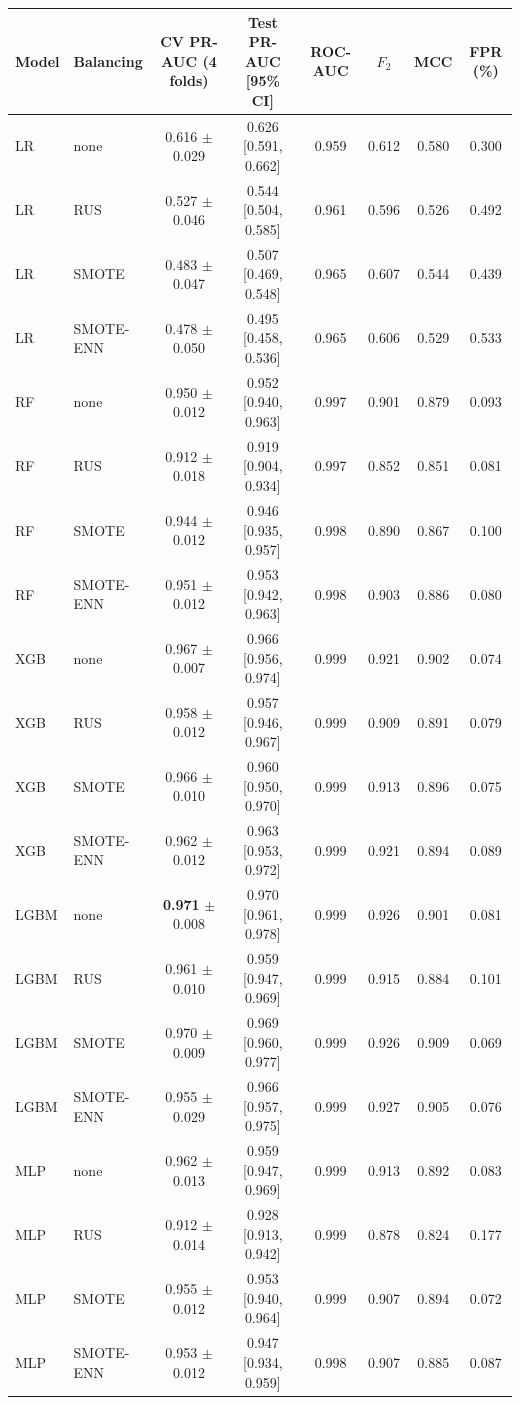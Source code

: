 \begin{tabular}{llcccccc}
\hline
Model & Balancing & CV PR-AUC (4 folds) & Test PR-AUC [95\% CI] & ROC-AUC & $F_2$ & MCC & FPR (\%) \\
\hline
LR & none & {0.616} $\pm$ 0.029 & 0.626 [0.591, 0.662] & 0.959 & 0.612 & 0.580 & 0.300 \\
LR & RUS & {0.527} $\pm$ 0.046 & 0.544 [0.504, 0.585] & 0.961 & 0.596 & 0.526 & 0.492 \\
LR & SMOTE & {0.483} $\pm$ 0.047 & 0.507 [0.469, 0.548] & 0.965 & 0.607 & 0.544 & 0.439 \\
LR & SMOTE-ENN & {0.478} $\pm$ 0.050 & 0.495 [0.458, 0.536] & 0.965 & 0.606 & 0.529 & 0.533 \\
RF & none & {0.950} $\pm$ 0.012 & 0.952 [0.940, 0.963] & 0.997 & 0.901 & 0.879 & 0.093 \\
RF & RUS & {0.912} $\pm$ 0.018 & 0.919 [0.904, 0.934] & 0.997 & 0.852 & 0.851 & 0.081 \\
RF & SMOTE & {0.944} $\pm$ 0.012 & 0.946 [0.935, 0.957] & 0.998 & 0.890 & 0.867 & 0.100 \\
RF & SMOTE-ENN & {0.951} $\pm$ 0.012 & 0.953 [0.942, 0.963] & 0.998 & 0.903 & 0.886 & 0.080 \\
XGB & none & {0.967} $\pm$ 0.007 & 0.966 [0.956, 0.974] & 0.999 & 0.921 & 0.902 & 0.074 \\
XGB & RUS & {0.958} $\pm$ 0.012 & 0.957 [0.946, 0.967] & 0.999 & 0.909 & 0.891 & 0.079 \\
XGB & SMOTE & {0.966} $\pm$ 0.010 & 0.960 [0.950, 0.970] & 0.999 & 0.913 & 0.896 & 0.075 \\
XGB & SMOTE-ENN & {0.962} $\pm$ 0.012 & 0.963 [0.953, 0.972] & 0.999 & 0.921 & 0.894 & 0.089 \\
LGBM & none & \textbf{0.971} $\pm$ 0.008 & 0.970 [0.961, 0.978] & 0.999 & 0.926 & 0.901 & 0.081 \\
LGBM & RUS & {0.961} $\pm$ 0.010 & 0.959 [0.947, 0.969] & 0.999 & 0.915 & 0.884 & 0.101 \\
LGBM & SMOTE & {0.970} $\pm$ 0.009 & 0.969 [0.960, 0.977] & 0.999 & 0.926 & 0.909 & 0.069 \\
LGBM & SMOTE-ENN & {0.955} $\pm$ 0.029 & 0.966 [0.957, 0.975] & 0.999 & 0.927 & 0.905 & 0.076 \\
MLP & none & {0.962} $\pm$ 0.013 & 0.959 [0.947, 0.969] & 0.999 & 0.913 & 0.892 & 0.083 \\
MLP & RUS & {0.912} $\pm$ 0.014 & 0.928 [0.913, 0.942] & 0.999 & 0.878 & 0.824 & 0.177 \\
MLP & SMOTE & {0.955} $\pm$ 0.012 & 0.953 [0.940, 0.964] & 0.999 & 0.907 & 0.894 & 0.072 \\
MLP & SMOTE-ENN & {0.953} $\pm$ 0.012 & 0.947 [0.934, 0.959] & 0.998 & 0.907 & 0.885 & 0.087 \\
\hline
\end{tabular}
